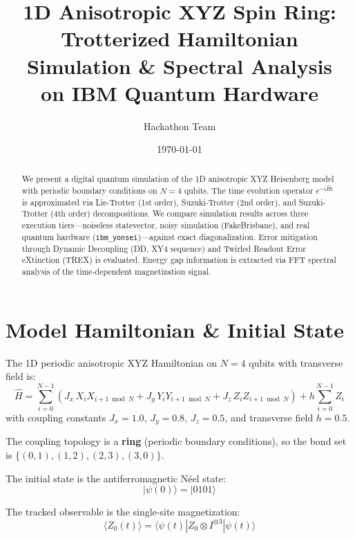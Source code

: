 \documentclass[11pt,a4paper]{article}
\title{1D Anisotropic XYZ Spin Ring:\\Trotterized Hamiltonian Simulation \& Spectral Analysis\\on IBM Quantum Hardware}
\author{Hackathon Team}
\date{\today}
\begin{document}
\maketitle

\begin{abstract}
We present a digital quantum simulation of the 1D anisotropic XYZ Heisenberg model with periodic boundary conditions on $N=4$ qubits. 
The time evolution operator $e^{-i\hat{H}t}$ is approximated via Lie-Trotter (1st order), Suzuki-Trotter (2nd order), and Suzuki-Trotter (4th order) decompositions. 
We compare simulation results across three execution tiers---noiseless statevector, noisy simulation (FakeBrisbane), and real quantum hardware (\texttt{ibm\_yonsei})---against exact diagonalization. 
Error mitigation through Dynamic Decoupling (DD, XY4 sequence) and Twirled Readout Error eXtinction (TREX) is evaluated.
Energy gap information is extracted via FFT spectral analysis of the time-dependent magnetization signal.
\end{abstract}

\section{Model Hamiltonian \& Initial State}

The 1D periodic anisotropic XYZ Hamiltonian on $N=4$ qubits with transverse field is:
\begin{equation}
    \hat{H} = \sum_{i=0}^{N-1} \left( J_x\, X_i X_{i+1 \bmod N} + J_y\, Y_i Y_{i+1 \bmod N} + J_z\, Z_i Z_{i+1 \bmod N} \right) + h \sum_{i=0}^{N-1} Z_i
\end{equation}
with coupling constants $J_x = 1.0$, $J_y = 0.8$, $J_z = 0.5$, and transverse field $h = 0.5$.

The coupling topology is a \textbf{ring} (periodic boundary conditions), so the bond set is $\{(0,1), (1,2), (2,3), (3,0)\}$.

The initial state is the antiferromagnetic N\'eel state:
\begin{equation}
    |\psi(0)\rangle = |0101\rangle
\end{equation}

The tracked observable is the single-site magnetization:
\begin{equation}
    \langle Z_0(t) \rangle = \langle\psi(t)| Z_0 \otimes I^{\otimes 3} |\psi(t)\rangle
\end{equation}
\end{document}
